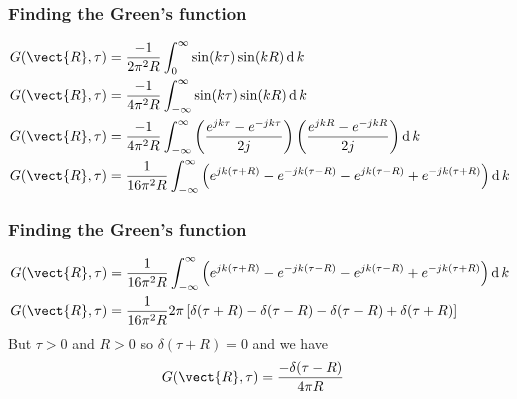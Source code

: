 \documentclass[12 pt, compress, handout, intlimits]{beamer}
\renewcommand{\d}{\operatorname{d}}
\begin{document}
\begin{frame}[fragile]
    \frametitle{Finding the Green's function}

    \begin{align*}
        G(\vect{R},\tau) &= \frac{-1}{2 \pi^2 R} \int_0^\infty \sin(k \tau) \sin(k R) \d k
        \\
        G(\vect{R},\tau) &= \frac{-1}{4 \pi^2 R} \int_{-\infty}^\infty \sin(k \tau) \sin(k R) \d k
        \\
        G(\vect{R},\tau) &= \frac{-1}{4 \pi^2 R} \int_{-\infty}^\infty \left( \frac{e^{j k \tau} - e^{-j k \tau}}{2 j}\right) \left( \frac{e^{j k R} - e^{-j k R}}{2j}\right) \d k
        \\
        G(\vect{R},\tau) &= \frac{1}{16 \pi^2 R} \int_{-\infty}^\infty \left( e^{j k (\tau + R)} - e^{-j k (\tau - R)} - e^{j k (\tau - R)} + e^{-j k (\tau + R)} \right) \d k
    \end{align*}
    
\end{frame}

\note{}

\begin{frame}[fragile]
    \frametitle{Finding the Green's function}
    
    \begin{align*}
        G(\vect{R},\tau) &= \frac{1}{16 \pi^2 R} \int_{-\infty}^\infty \left( e^{j k (\tau + R)} - e^{-j k (\tau - R)} - e^{j k (\tau - R)} + e^{-j k (\tau + R)} \right) \d k
        \\
        G(\vect{R},\tau) &= \frac{1}{16 \pi^2 R} 2 \pi \left[ \delta(\tau + R) - \delta(\tau - R) - \delta(\tau - R) + \delta(\tau + R) \right]
    \end{align*}
    But $ \tau > 0 $ and $ R > 0 $ so $ \delta(\tau + R) = 0 $ and we have
    \begin{align*}
        G(\vect{R},\tau) &= \frac{- \delta(\tau - R)}{4 \pi R}
    \end{align*}
    
\end{frame}

\note{}
\end{document}
